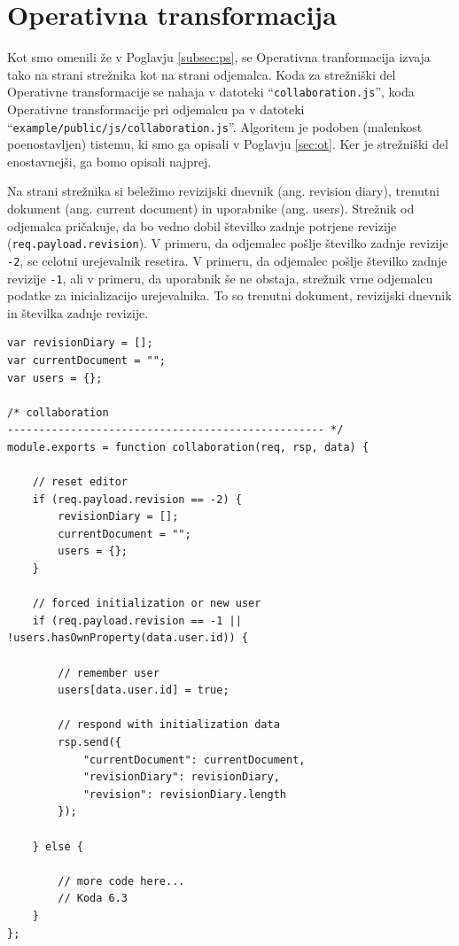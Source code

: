 \documentclass[a4paper, 12pt, twoside]{book}
\begin{document}
\section{Operativna transformacija}
\label{sec:imp-ot}

Kot smo omenili že v Poglavju \ref{subsec:ps}, se Operativna tranformacija izvaja tako na strani strežnika kot na strani odjemalca. Koda za strežniški del Operativne transformacije se nahaja v datoteki “{\tt collaboration.js}”, koda Operativne transformacije pri odjemalcu pa v datoteki “{\tt example/public/js/collaboration.js}”. Algoritem je podoben (malenkost poenostavljen) tistemu, ki smo ga opisali v Poglavju \ref{sec:ot}. Ker je strežniški del enostavnejši, ga bomo opisali najprej.

Na strani strežnika si beležimo revizijski dnevnik (ang. revision diary), trenutni dokument (ang. current document) in uporabnike (ang. users). Strežnik od odjemalca pričakuje, da bo vedno dobil številko zadnje potrjene revizije ({\tt req.payload.revision}). V primeru, da odjemalec pošlje številko zadnje revizije {\tt -2}, se celotni urejevalnik resetira. V primeru, da odjemalec pošlje številko zadnje revizije {\tt -1}, ali v primeru, da uporabnik še ne obstaja, strežnik vrne odjemalcu podatke za inicializacijo urejevalnika. To so trenutni dokument, revizijski dnevnik in številka zadnje revizije.\newline

\begin{lstlisting}[title={Koda 6.2: Strežnik odjemalcu vrne podatke za inicializacijo urejevalnika.}]
var revisionDiary = [];
var currentDocument = "";
var users = {};

/* collaboration
-------------------------------------------------- */
module.exports = function collaboration(req, rsp, data) {

    // reset editor
    if (req.payload.revision == -2) {
        revisionDiary = [];
        currentDocument = "";
        users = {};
    }

    // forced initialization or new user
    if (req.payload.revision == -1 || !users.hasOwnProperty(data.user.id)) {

        // remember user
        users[data.user.id] = true;

        // respond with initialization data
        rsp.send({
            "currentDocument": currentDocument,
            "revisionDiary": revisionDiary,
            "revision": revisionDiary.length
        });

    } else {

        // more code here...
        // Koda 6.3
    }
};
\end{lstlisting}
\end{document}
